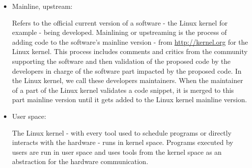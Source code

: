 \begin{itemize}
\item Mainline, upstream:

Refers to the official current version of a software - the Linux kernel for example - being developed. Mainlining or upstreaming is the process of adding code to the software's mainline version - from \url{http://kernel.org} for the Linux kernel. This process includes comments and critics from the community supporting the software and then validation of the proposed code by the developers in charge of the software part impacted by the proposed code. In the Linux kernel, we call these developers maintainers. When the maintainer of a part of the Linux kernel validates a code snippet, it is merged to this part mainline version until it gets added to the Linux kernel mainline version.

\item User space:

The Linux kernel - with every tool used to schedule programs or directly interacts with the hardware - runs in kernel space. Programs executed by users are run in user space and uses tools from the kernel space as an abstraction for the hardware communication.

\end{itemize}
